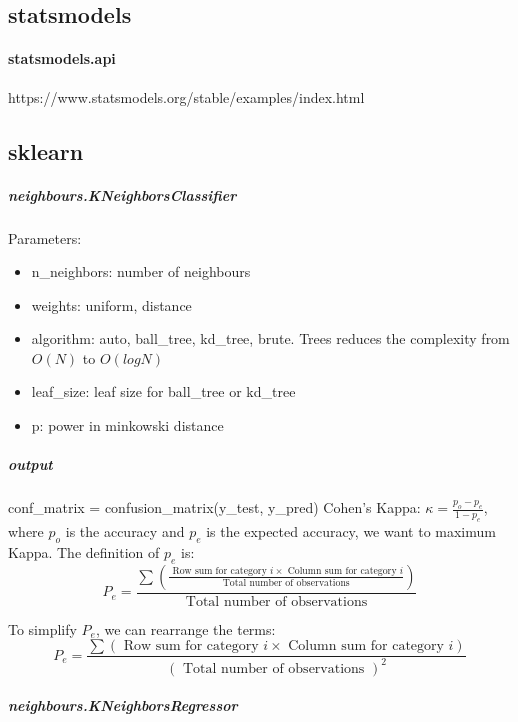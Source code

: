 \documentclass[12pt,a4paper]{article}
\begin{document}
\subsection{statsmodels}
    \paragraph{statsmodels.api}
    https://www.statsmodels.org/stable/examples/index.html
\subsection{sklearn}
    \subparagraph{neighbours.KNeighborsClassifier}
    Parameters:
        \begin{itemize}
            \item n\_neighbors: number of neighbours
            \item weights: uniform, distance
            \item algorithm: auto, ball\_tree, kd\_tree, brute. Trees reduces the complexity from $O(N)$ to $O(logN)$
            \item leaf\_size: leaf size for ball\_tree or kd\_tree
            \item p: power in minkowski distance
        \end{itemize}
    \subparagraph{output}
        conf\_matrix = confusion\_matrix(y\_test, y\_pred)
        Cohen's Kappa: $\kappa=\frac{p_o-p_e}{1-p_e}$, where $p_o$ is the accuracy and $p_e$ is the expected accuracy, we want to maximum Kappa.
        The definition of $p_e$ is:
        $$
        P_e=\frac{\sum\left(\frac{\text { Row sum for category } i \times \text { Column sum for category } i}{\text { Total number of observations }}\right)}{\text { Total number of observations }}
        $$
        
        To simplify $P_e$, we can rearrange the terms:
        $$
        P_e=\frac{\sum(\text { Row sum for category } i \times \text { Column sum for category } i)}{(\text { Total number of observations })^2}
        $$
    \subparagraph{neighbours.KNeighborsRegressor}
    
\end{document}
